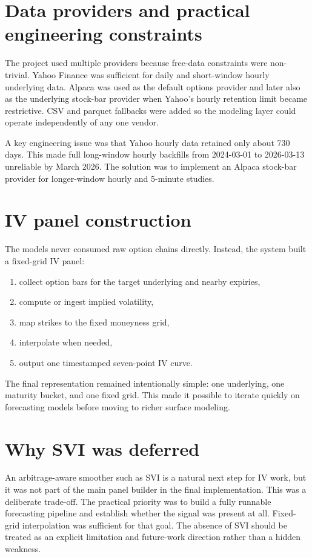 \documentclass[12pt]{report}
\begin{document}
\section{Data providers and practical engineering constraints}
The project used multiple providers because free-data constraints were non-trivial. Yahoo Finance was sufficient for daily and short-window hourly underlying data. Alpaca was used as the default options provider and later also as the underlying stock-bar provider when Yahoo's hourly retention limit became restrictive. CSV and parquet fallbacks were added so the modeling layer could operate independently of any one vendor.

A key engineering issue was that Yahoo hourly data retained only about 730 days. This made full long-window hourly backfills from 2024-03-01 to 2026-03-13 unreliable by March 2026. The solution was to implement an Alpaca stock-bar provider for longer-window hourly and 5-minute studies.

\section{IV panel construction}
The models never consumed raw option chains directly. Instead, the system built a fixed-grid IV panel:
\begin{enumerate}[leftmargin=1.2cm]
    \item collect option bars for the target underlying and nearby expiries,
    \item compute or ingest implied volatility,
    \item map strikes to the fixed moneyness grid,
    \item interpolate when needed,
    \item output one timestamped seven-point IV curve.
\end{enumerate}

The final representation remained intentionally simple: one underlying, one maturity bucket, and one fixed grid. This made it possible to iterate quickly on forecasting models before moving to richer surface modeling.

\section{Why SVI was deferred}
An arbitrage-aware smoother such as SVI is a natural next step for IV work, but it was not part of the main panel builder in the final implementation. This was a deliberate trade-off. The practical priority was to build a fully runnable forecasting pipeline and establish whether the signal was present at all. Fixed-grid interpolation was sufficient for that goal. The absence of SVI should be treated as an explicit limitation and future-work direction rather than a hidden weakness.
\end{document}
